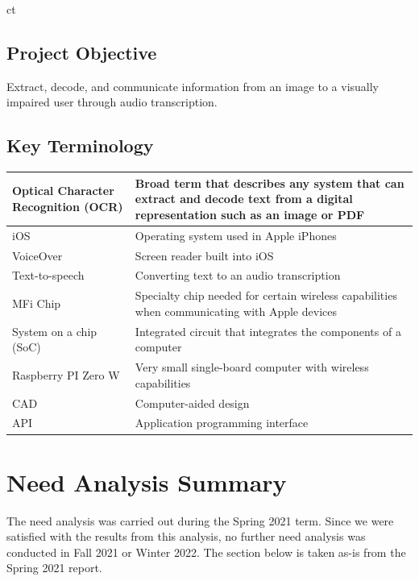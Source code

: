 ct\documentclass[a4paper,11pt]{article}
\begin{document}
\subsection{Project Objective}
Extract, decode, and communicate information from an image to a visually impaired user through audio transcription.

\subsection{Key Terminology}
\setlength{\tabcolsep}{1em}
\begin{table}[ht]
    \centering
    \begin{tabular}{|p{5cm}|p{10cm}|}
        \hline
        Optical Character Recognition (OCR) & Broad term that describes any system that can extract and decode text from a digital representation such as an image or PDF \\ \hline
        iOS & Operating system used in Apple iPhones \\ \hline
        VoiceOver & Screen reader built into iOS \\ \hline
        Text-to-speech & Converting text to an audio transcription \\ \hline
        MFi Chip & Specialty chip needed for certain wireless capabilities when communicating with Apple devices \\ \hline
        System on a chip (SoC) & Integrated circuit that integrates the components of a computer \\ \hline
        Raspberry PI Zero W & Very small single-board computer with wireless capabilities \\ \hline
        CAD & Computer-aided design \\
        \hline
        API & Application programming interface \\
        \hline
    \end{tabular}
\end{table}

\section{Need Analysis Summary}
\label{need-analysis-summary}
The need analysis was carried out during the Spring 2021 term. Since we were satisfied with the results from this analysis, no further need analysis was conducted in Fall 2021 or Winter 2022. The section below is taken as-is from the Spring 2021 report.
\end{document}
